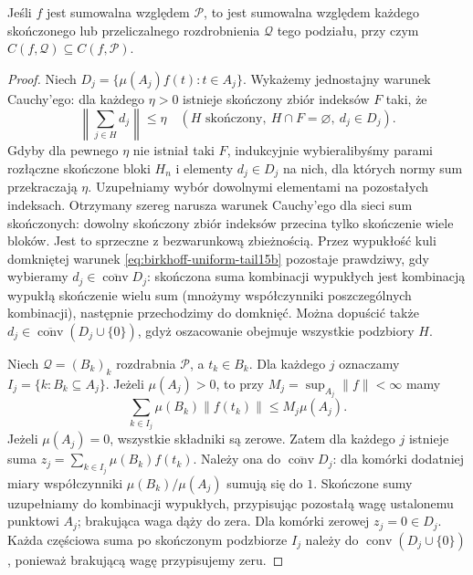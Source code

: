 \begin{lemat}
\label{lem:birkhoff-refinement15b}
Jeśli $f$ jest sumowalna względem $\mathcal P$,
to jest sumowalna względem każdego skończonego
lub przeliczalnego rozdrobnienia $\mathcal Q$ tego podziału, przy czym
$C(f,\mathcal Q)\subseteq C(f,\mathcal P)$.
\end{lemat}
\begin{proof}
Niech $D_j=\{\mu(A_j)f(t):t\in A_j\}$.
Wykażemy jednostajny warunek Cauchy'ego:
dla każdego $\eta>0$ istnieje skończony zbiór
indeksów $F$ taki, że
\begin{equation}\label{eq:birkhoff-uniform-tail15b}
 \left\|\sum_{j\in H}d_j\right\|\le\eta
 \quad(H\text{ skończony},\ H\cap F=\varnothing,\ d_j\in D_j).
\end{equation}
Gdyby dla pewnego $\eta$ nie istniał taki $F$,
indukcyjnie wybieralibyśmy parami rozłączne skończone
bloki $H_n$ i elementy $d_j\in D_j$ na nich,
dla których normy sum przekraczają $\eta$.
Uzupełniamy wybór dowolnymi elementami na pozostałych
indeksach. Otrzymany szereg narusza warunek Cauchy'ego
dla sieci sum skończonych: dowolny skończony zbiór
indeksów przecina tylko skończenie wiele bloków.
Jest to sprzeczne z bezwarunkową zbieżnością.
Przez wypukłość kuli domkniętej warunek
\eqref{eq:birkhoff-uniform-tail15b} pozostaje prawdziwy,
gdy wybieramy $d_j\in\overline{\operatorname{conv}}D_j$:
skończona suma kombinacji wypukłych jest kombinacją
wypukłą skończenie wielu sum (mnożymy współczynniki
poszczególnych kombinacji), następnie przechodzimy
do domknięć. Można dopuścić także
$d_j\in\overline{\operatorname{conv}}(D_j\cup\{0\})$,
gdyż oszacowanie obejmuje wszystkie podzbiory $H$.

Niech $\mathcal Q=(B_k)_k$ rozdrabnia $\mathcal P$,
a $t_k\in B_k$. Dla każdego $j$ oznaczamy
$I_j=\{k:B_k\subseteq A_j\}$. Jeżeli $\mu(A_j)>0$,
to przy $M_j=\sup_{A_j}\|f\|<\infty$ mamy
\[
 \sum_{k\in I_j}\mu(B_k)\|f(t_k)\|\le M_j\mu(A_j).
\]
Jeżeli $\mu(A_j)=0$, wszystkie składniki są zerowe.
Zatem dla każdego $j$ istnieje suma
$z_j=\sum_{k\in I_j}\mu(B_k)f(t_k)$.
Należy ona do $\overline{\operatorname{conv}}D_j$:
dla komórki dodatniej miary współczynniki
$\mu(B_k)/\mu(A_j)$ sumują się do $1$.
Skończone sumy uzupełniamy do kombinacji wypukłych,
przypisując pozostałą wagę ustalonemu punktowi
$A_j$; brakująca waga dąży do zera.
Dla komórki zerowej $z_j=0\in D_j$.
Każda częściowa suma po skończonym podzbiorze
$I_j$ należy do $\operatorname{conv}(D_j\cup\{0\})$,
ponieważ brakującą wagę przypisujemy zeru.


\end{proof}
